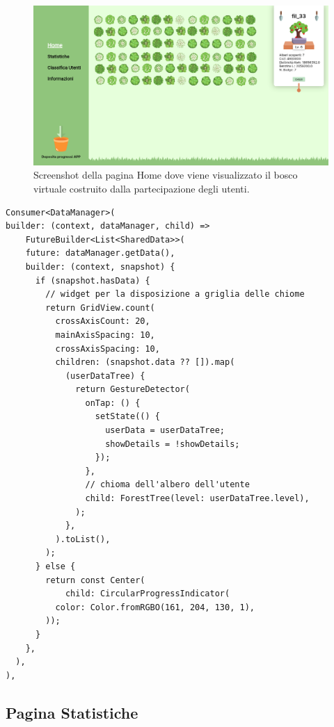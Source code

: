 \begin{figure}[h]
  \centering
  \includegraphics[width=\textwidth]{img/totem/screenshot/homepage.png}
  \caption{Screenshot della pagina Home dove viene visualizzato il bosco virtuale costruito dalla partecipazione degli utenti.}
  \label{fig:homepage}
\end{figure}
\newpage
\begin{lstlisting}[style=FlutterStyle, caption={Parte del codice per la creazione del bosco della Homepage}, label={lst:homepageCode}]
Consumer<DataManager>(
builder: (context, dataManager, child) =>
    FutureBuilder<List<SharedData>>(
    future: dataManager.getData(),
    builder: (context, snapshot) {
      if (snapshot.hasData) {
        // widget per la disposizione a griglia delle chiome
        return GridView.count(
          crossAxisCount: 20,
          mainAxisSpacing: 10,
          crossAxisSpacing: 10,
          children: (snapshot.data ?? []).map(
            (userDataTree) {
              return GestureDetector(
                onTap: () {
                  setState(() {
                    userData = userDataTree;
                    showDetails = !showDetails;
                  });
                },
                // chioma dell'albero dell'utente
                child: ForestTree(level: userDataTree.level),
              );
            },
          ).toList(),
        );
      } else {
        return const Center(
            child: CircularProgressIndicator(
          color: Color.fromRGBO(161, 204, 130, 1),
        ));
      }
    },
  ),
),
\end{lstlisting}
%
%
\subsection{Pagina Statistiche}

